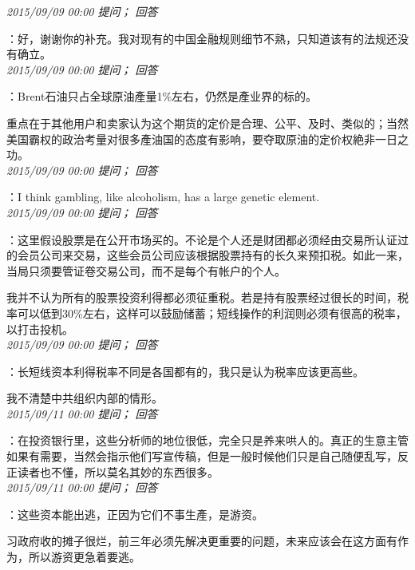 \documentclass[twocolumn]{ctexart}
\begin{document}
\textit{\hfill\noindent\small 2015/09/09 00:00 提问； 回答}

：好，谢谢你的补充。我对现有的中国金融规则细节不熟，只知道该有的法规还没有确立。\\

\textit{\hfill\noindent\small 2015/09/09 00:00 提问； 回答}

：Brent石油只占全球原油產量1\%左右，仍然是產业界的标的。

重点在于其他用户和卖家认为这个期货的定价是合理、公平、及时、类似的；当然美国霸权的政治考量对很多產油国的态度有影响，要夺取原油的定价权絶非一日之功。\\

\textit{\hfill\noindent\small 2015/09/09 00:00 提问； 回答}

：I think gambling, like alcoholism, has a large genetic element.\\

\textit{\hfill\noindent\small 2015/09/09 00:00 提问； 回答}

：这里假设股票是在公开市场买的。不论是个人还是财团都必须经由交易所认证过的会员公司来交易，这些会员公司应该根据股票持有的长久来预扣税。如此一来，当局只须要管证卷交易公司，而不是每个有帐户的个人。

我并不认为所有的股票投资利得都必须征重税。若是持有股票经过很长的时间，税率可以低到30\%左右，这样可以鼓励储蓄；短线操作的利润则必须有很高的税率，以打击投机。\\

\textit{\hfill\noindent\small 2015/09/09 00:00 提问； 回答}

：长短线资本利得税率不同是各国都有的，我只是认为税率应该更高些。

我不清楚中共组织内部的情形。\\

\textit{\hfill\noindent\small 2015/09/11 00:00 提问； 回答}

：在投资银行里，这些分析师的地位很低，完全只是养来哄人的。真正的生意主管如果有需要，当然会指示他们写宣传稿，但是一般时候他们只是自己随便乱写，反正读者也不懂，所以莫名其妙的东西很多。\\

\textit{\hfill\noindent\small 2015/09/11 00:00 提问； 回答}

：这些资本能出逃，正因为它们不事生產，是游资。

习政府收的摊子很烂，前三年必须先解决更重要的问题，未来应该会在这方面有作为，所以游资更急着要逃。\\
\end{document}
